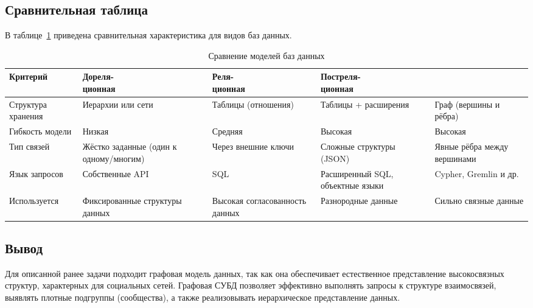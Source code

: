 \subsection{Сравнительная таблица}

В таблице~\ref{tbl:db_models} приведена сравнительная характеристика для видов баз данных.

\begin{table}[H]
	\begin{center}
		\begin{threeparttable}
			\caption{Сравнение моделей баз данных}
			\label{tbl:db_models}
			\begin{tabular}{|p{3cm}|p{3.5cm}|p{2.1cm}|p{2.9cm}|p{2.6cm}|}
				\hline
				Критерий & \makecell{Дореля-\\ционная} & \makecell{Реля-\\ционная} & \makecell{Постреля-\\ционная} & \makecell{Графовая} \\
				\hline
				Структура хранения & Иерархии или сети & Таблицы (отношения) & Таблицы + расширения & Граф (вершины и рёбра) \\
				\hline
				Гибкость модели & Низкая & Средняя & Высокая & Высокая \\
				\hline
				Тип связей & Жёстко заданные (один к одному/многим) & Через внешние ключи & Сложные структуры (JSON) & Явные рёбра между вершинами \\
				\hline
				Язык запросов & Собственные API & SQL & Расширенный SQL, объектные языки & Cypher, Gremlin и др. \\
				\hline
				Используется & Фиксированные структуры данных & Высокая согласованность данных & Разнородные данные & Сильно связные данные \\
				\hline
			\end{tabular}
		\end{threeparttable}
	\end{center}
\end{table}

\subsection{Вывод}

Для описанной ранее задачи подходит графовая модель данных, так как она обеспечивает естественное представление высокосвязных структур, характерных для социальных сетей. Графовая СУБД позволяет эффективно выполнять запросы к структуре взаимосвязей, выявлять плотные подгруппы (сообщества), а также реализовывать иерархическое представление данных.


